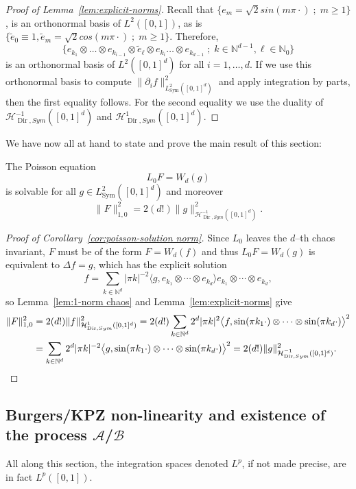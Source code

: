 \documentclass[10pt]{amsart}
\theoremstyle{definition}\newtheorem{defi}[theo]{Definition}\newtheorem{rema}[theo]{Remark}\newtheorem{exam}[theo]{Example}\newtheorem{exem}[theo]{Example}\newtheorem{nota}[theo]{Notation}
\DeclareMathOperator{\Dir}{Dir}
\DeclareMathOperator{\Sym}{Sym}
\newcommand{\mc}[1]{{\mathcal #1}}
\renewcommand{\mc}[1]{{\mathcal #1}}
\newcommand{\NN}{\mathbb N}
\renewcommand{\ge}{\geqslant}
\renewcommand{\tilde}{\widetilde}
\begin{document}
\begin{proof}[Proof of Lemma~\ref{lem:explicit-norms}]
Recall that $\{e_m = \sqrt{2} sin(m \pi \cdot)\; ; \; m \ge 1\}$, is an orthonormal basis of $L^2([0,1])$, as is $\{\tilde e_0 \equiv 1, \tilde e_m = \sqrt{2} cos(m \pi \cdot) \; ;\; m \ge 1\}$. Therefore,
\[
\big\{e_{k_1} \otimes \dots \otimes e_{k_{i-1}} \otimes \tilde e_\ell \otimes e_{k_i} \dots \otimes e_{k_{d-1}}\; ; \; k \in \NN^{d-1}, \ell \in \NN_0\big\}
\]
is an orthonormal basis of $L^2([0,1]^d)$ for all $i = 1,\dots, d$. If we use this orthonormal basis to compute $\| \partial_{i} f \|_{L^2_{\Sym} ([0, 1]^d)}^2$ and apply integration by parts, then the first equality follows. For the second equality we use the duality of $\mc H_{\Dir, Sym}^{-1} ([0, 1]^d)$ and $\mc H_{\Dir, Sym}^1 ([0, 1]^d)$.
\end{proof}

We have now all at hand to state and prove the main result of this section:

\begin{coro}\label{cor:poisson-solution norm}
The Poisson equation
\[
L_0 F = W_d (g)
\]
is solvable for all $g \in L^2_{\Sym} ([0, 1]^d)$ and moreover
\[
\| F \|_{1,0}^2 = 2 (d!)\| g
\|_{\mc H_{\Dir, Sym}^{-1} ([0, 1]^d)}^2.
\]
\end{coro}

\begin{proof}[Proof of Corollary~\ref{cor:poisson-solution norm}]
Since $L_0$ leaves the $d$--th chaos invariant, $F$ must be of the form $F = W_d (f)$ and thus $L_0 F = W_d (g)$ is equivalent to $\Delta f = g$, which has the explicit solution
\[
f = \sum_{k \in \mathbb{N}^d} | \pi k |^{- 2} \big\langle g, e_{k_1} \otimes \cdots \otimes e_{k_d} \big\rangle e_{k_1}\otimes \cdots \otimes e_{k_d},
\]
so Lemma~\ref{lem:1-norm chaos} and Lemma~\ref{lem:explicit-norms} give
\begin{align*}
\| F \|_{1,0}^2 & = 2 (d!) \| f \|_{\mc H_{\Dir, Sym}^1 ([0, 1]^d)}^2 = 2 (d!) \sum_{k \in
\mathbb{N}^d} 2^d | \pi k |^2 \big\langle f, \sin (\pi k_1 \cdot) \otimes
\cdots \otimes \sin (\pi k_d \cdot) \big\rangle^2\\
& = \sum_{k \in \mathbb{N}^d} 2^d | \pi k |^{- 2} \big\langle g, \sin (\pi k_1
\cdot) \otimes \cdots \otimes \sin (\pi k_d \cdot) \big\rangle^2 = 2 (d!) \| g \|_{\mc H_{\Dir, Sym}^{-1} ([0, 1]^d)}^2.\qedhere
\end{align*}
\end{proof}

\subsection{Burgers/KPZ non-linearity and existence of the process \texorpdfstring{$\mc A$}{A}/\texorpdfstring{$\mc B$}{B}}\label{ssec:construct}
All along this section, the integration spaces denoted $L^p$, if not made precise, are in fact $L^p([0,1])$.
\end{document}
